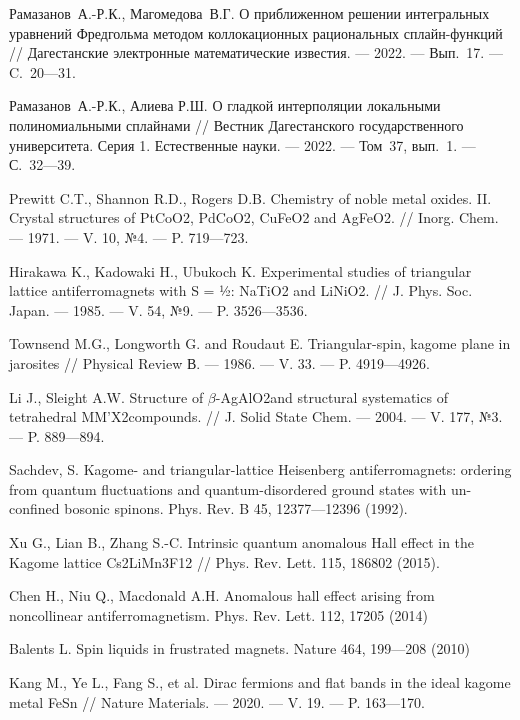 \begin{thebibliography}{111}
Рамазанов~А.-Р.К., Магомедова~В.Г.
О приближенном решении интегральных уравнений Фредгольма методом коллокационных рациональных сплайн-функций
//
Дагестанские электронные математические известия.
--- 2022.
--- Вып.~17.
--- C.~20---31.

Рамазанов~А.-Р.К., Алиева Р.Ш.
О гладкой интерполяции локальными полиномиальными сплайнами
//
Вестник Дагестанского государственного университета. Серия 1. Естественные науки.
--- 2022.
--- Том~37, вып.~1.
--- С.~32---39.



Prewitt C.T., Shannon R.D., Rogers D.B.
Chemistry of noble metal oxides. II. Crystal structures of PtCoO2, PdCoO2, CuFeO2 and AgFeO2.
//
Inorg. Chem.
--- 1971.
--- V. 10, №4.
--- P. 719---723.

Hirakawa K., Kadowaki H., Ubukoch K.
Experimental studies of triangular lattice antiferromagnets with S = ½: NaTiO2 and LiNiO2.
//
J. Phys. Soc. Japan.
--- 1985.
--- V. 54, №9.
--- P. 3526---3536.

Townsend M.G., Longworth G. and Roudaut E.
Triangular-spin, kagome plane in jarosites
//
Physical Review В.
--- 1986.
--- V. 33.
--- P. 4919---4926.

Li J., Sleight A.W.
Structure of $\beta$-AgAlO2and structural systematics of tetrahedral MM'X2compounds.
//
J. Solid State Chem.
--- 2004.
--- V. 177, №3.
--- P. 889---894.

Sachdev, S.
Kagome- and triangular-lattice Heisenberg antiferromagnets: ordering from quantum fluctuations and quantum-disordered ground states with un-confined bosonic spinons. Phys. Rev. B 45, 12377---12396 (1992).

Xu G., Lian B., Zhang S.-C.
Intrinsic quantum anomalous Hall effect in the Kagome lattice Cs2LiMn3F12
//
Phys. Rev. Lett. 115, 186802 (2015).

Chen H., Niu Q., Macdonald A.H.
Anomalous hall effect arising from noncollinear antiferromagnetism. Phys. Rev. Lett. 112, 17205 (2014)

Balents L.
Spin liquids in frustrated magnets. Nature 464, 199---208 (2010)

Kang M., Ye L., Fang S., et al.
Dirac fermions and flat bands in the ideal kagome metal FeSn
//
Nature Materials.
--- 2020.
--- V. 19.
--- P. 163---170.


\end{thebibliography}
